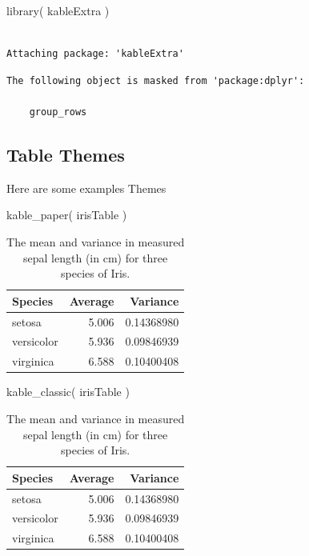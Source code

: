 \documentclass[
  letterpaper,
]{book}
\newenvironment{Shaded}{\begin{snugshade}}{\end{snugshade}}
\newcommand{\FunctionTok}[1]{\textcolor[rgb]{0.28,0.35,0.67}{#1}}
\newcommand{\NormalTok}[1]{\textcolor[rgb]{0.00,0.23,0.31}{#1}}
\begin{document}
\begin{Shaded}
\begin{Highlighting}[]
\FunctionTok{library}\NormalTok{( kableExtra )}
\end{Highlighting}
\end{Shaded}

\begin{verbatim}

Attaching package: 'kableExtra'
\end{verbatim}

\begin{verbatim}
The following object is masked from 'package:dplyr':

    group_rows
\end{verbatim}

\subsection{Table Themes}\label{table-themes}

Here are some examples Themes

\begin{Shaded}
\begin{Highlighting}[]
\FunctionTok{kable\_paper}\NormalTok{( irisTable )}
\end{Highlighting}
\end{Shaded}

\begin{longtable}[t]{lrr}
\caption{\label{tab:unnamed-chunk-38}The mean and variance in measured sepal length (in cm) for three species of Iris.}\\
\toprule
Species & Average & Variance\\
\midrule
setosa & 5.006 & 0.14368980\\
versicolor & 5.936 & 0.09846939\\
virginica & 6.588 & 0.10400408\\
\bottomrule
\end{longtable}

\begin{Shaded}
\begin{Highlighting}[]
\FunctionTok{kable\_classic}\NormalTok{( irisTable )}
\end{Highlighting}
\end{Shaded}

\begin{longtable}[t]{lrr}
\caption{\label{tab:unnamed-chunk-39}The mean and variance in measured sepal length (in cm) for three species of Iris.}\\
\toprule
Species & Average & Variance\\
\midrule
setosa & 5.006 & 0.14368980\\
versicolor & 5.936 & 0.09846939\\
virginica & 6.588 & 0.10400408\\
\bottomrule
\end{longtable}
\end{document}
